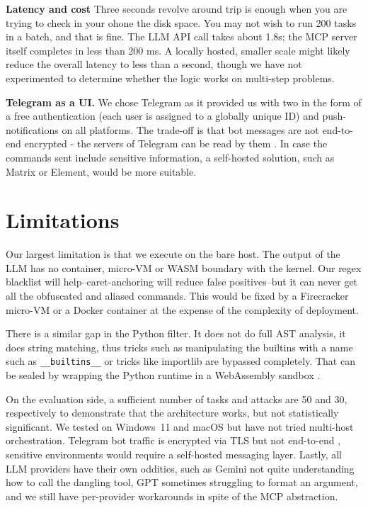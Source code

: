 \documentclass[conference]{IEEEtran}
\begin{document}
\textbf{Latency and cost}
Three seconds revolve around trip is enough when you are trying to check in your ohone the disk space. You may not wish to run 200 tasks in a batch, and that is fine. The LLM API call takes about 1.8s; the MCP server itself completes in less than 200 ms. A locally hosted, smaller scale might likely reduce the overall latency to less than a second, though we have not experimented to determine whether the logic works on multi-step problems.

\textbf{Telegram as a UI.}
We chose Telegram as it provided us with two in the form of a free authentication (each user is assigned to a globally unique ID) and push-notifications on all platforms. The trade-off is that bot messages are not end-to-end encrypted - the servers of Telegram can be read by them \cite{telegram2023botapi}. In case the commands sent include sensitive information, a self-hosted solution, such as Matrix or Element, would be more suitable.

\section{Limitations}
Our largest limitation is that we execute on the bare host. The output of the LLM has no container, micro-VM or WASM boundary with the kernel. Our regex blacklist will help--caret-anchoring will reduce false positives--but it can never get all the obfuscated and aliased commands. This would be fixed by a Firecracker micro-VM \cite{agache2020firecracker} or a Docker container \cite{sultan2019container} at the expense of the complexity of deployment.

There is a similar gap in the Python filter. It does not do full AST analysis, it does string matching, thus tricks such as manipulating the builtins with a name such as \texttt{\_\_builtins\_\_} or tricks like importlib are bypassed completely. That can be sealed by wrapping the Python runtime in a WebAssembly sandbox \cite{haas2017webassembly, perrone2024wasm}.

On the evaluation side, a sufficient number of tasks and attacks are 50 and 30, respectively to demonstrate that the architecture works, but not statistically significant. We tested on Windows~11 and macOS but have not tried multi-host orchestration. Telegram bot traffic is encrypted via TLS but not end-to-end \cite{telegram2023botapi}, sensitive environments would require a self-hosted messaging layer. Lastly, all LLM providers have their own oddities, such as Gemini not quite understanding how to call the dangling tool, GPT sometimes struggling to format an argument, and we still have per-provider workarounds in spite of the MCP abstraction.
\end{document}
